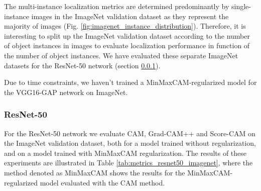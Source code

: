 The multi-instance localization metrics are determined predominantly by single-instance images in the ImageNet validation dataset as they represent the majority of images (Fig. \ref{fig:imagenet_instance_distribution}). Therefore, it is interesting to split up the ImageNet validation dataset according to the number of object instances in images to evaluate localization performance in function of the number of object instances. We have evaluated these separate ImageNet datasets for the ResNet-50 network (section \ref{sec:exp_resnet50_imagenet}).

Due to time constraints, we haven't trained a MinMaxCAM-regularized model for the VGG16-GAP network on ImageNet.

\subsubsection{ResNet-50} \label{sec:exp_resnet50_imagenet}

For the ResNet-50 network we evaluate CAM, Grad-CAM++ and Score-CAM on the ImageNet validation dataset, both for a model trained without regularization, and on a model trained with MinMaxCAM regularization. The results of these experiments are illustrated in Table \ref{tab:metrics_resnet50_imagenet}, where the method denoted as MinMaxCAM shows the results for the MinMaxCAM-regularized model evaluated with the CAM method. 

